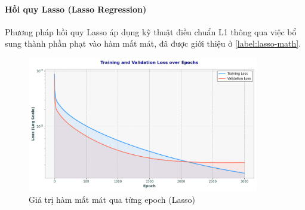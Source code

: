 \paragraph{Hồi quy Lasso (Lasso Regression)}
Phương pháp hồi quy Lasso áp dụng kỹ thuật điều chuẩn L1 thông qua việc bổ sung thành phần phạt vào hàm mất mát, đã được giới thiệu ở \ref{label:lasso-math}.

\begin{figure}[H]
    \centering
    \includegraphics[width=0.9\textwidth]{img_multiple/loss_lasso.png} %
    \caption{Giá trị hàm mất mát qua từng epoch (Lasso)}
    \label{fig:loss_lasso}
\end{figure}

